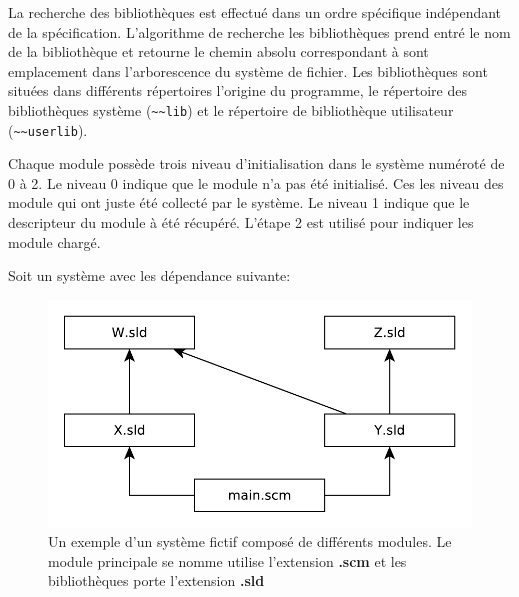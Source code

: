 

La recherche des bibliothèques est effectué dans un ordre spécifique
indépendant de la spécification.  L'algorithme de recherche les bibliothèques
prend entré le nom de la bibliothèque et retourne le chemin absolu
correspondant à sont emplacement dans l'arborescence du système de fichier. Les
bibliothèques sont situées dans différents répertoires l'origine du programme,
le répertoire des bibliothèques système (\lstinline{~~lib}) et le
répertoire de bibliothèque utilisateur (\lstinline{~~userlib}).


Chaque module possède trois niveau d'initialisation dans le système numéroté de
0 à 2. Le niveau 0 indique que le module n'a pas été initialisé. Ces les niveau
des module qui ont juste été collecté par le système. Le niveau 1 indique que
le descripteur du module à été récupéré. L'étape 2 est utilisé pour indiquer
les module chargé.

Soit un système avec les dépendance suivante:
\begin{figure}[ht]
  \includegraphics{figures/system-example}
  \caption{Un exemple d'un système fictif composé de différents modules.
  Le module principale se nomme utilise l'extension \textbf{.scm}
  et les bibliothèques porte l'extension \textbf{.sld}}
\end{figure} %


